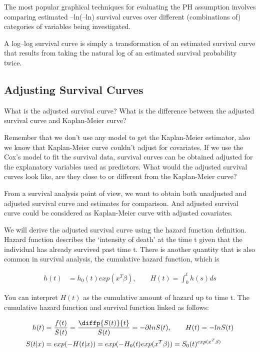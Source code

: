 \documentclass[11pt]{article} %
\begin{document}
The most popular graphical techniques for evaluating the PH assumption involves comparing estimated –ln(–ln) survival curves over different (combinations of) categories of variables being investigated.

A log–log survival curve is simply a transformation of an estimated survival curve that results from taking the natural log of an estimated survival probability twice.

\subsection{Adjusting Survival Curves}

What is the adjusted survival curve? What is the difference between the adjusted survival curve and Kaplan-Meier curve?

Remember that we don't use any model to get the Kaplan-Meier estimator, also we know that Kaplan-Meier curve couldn't adjust for covariates. If we use the Cox's model to fit the survival data, survival curves can be obtained adjusted for the explanatory variables used as predictors. What would the adjusted survival curves look like, are they close to or different from the Kaplan-Meier curve?

From a survival analysis point of view, we want to obtain both unadjusted and adjusted survival curve and estimates for comparison. And adjusted survival curve could be considered as Kaplan-Meier curve with adjusted covariates.


We will derive the adjusted survival curve using the hazard function definition. Hazard function describes the `intensity of death' at the time t given that the individual has already survived past time t. There is another quantity that is also common in survival analysis, the cumulative hazard function, which is

\begin{align*}
	h(t) &= h_0(t) exp(x^T \beta), \qquad H(t) = \int_{0}^t h(s) ds
\end{align*}

You can interpret $H(t)$ as the cumulative amount of hazard up to time t. The cumulative hazard function and survival function linked as follows:

\begin{align*}
	h(t) &= \frac{f(t)}{S(t)} = \frac{\diffp{S(t)}{t}}{S(t)} =  - \partial ln S(t), \qquad    H(t) = -ln S(t)\\
	S(t|x) &= exp(-H(t|x)) = exp(-H_0(t) exp(x^T \beta)) = S_0(t)^{exp(x^T \beta)}
\end{align*}
\end{document}
